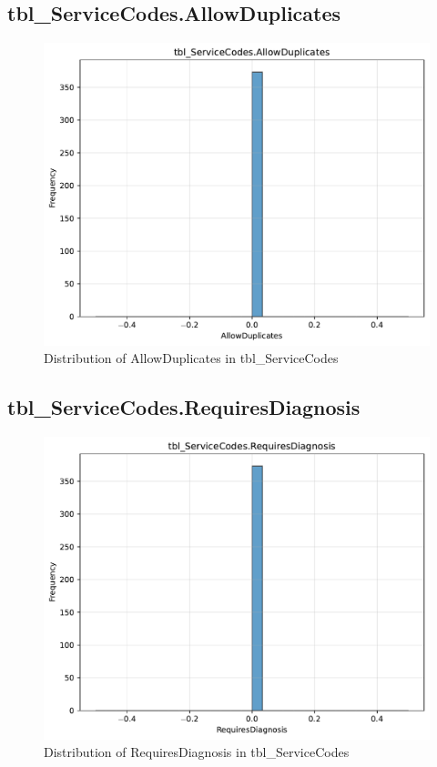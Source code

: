 \subsection{tbl\_ServiceCodes.AllowDuplicates}

\begin{figure}[htbp]
\centering
\includegraphics[width=\textwidth]{figures/dbo_tbl_ServiceCodes_AllowDuplicates.pdf}
\caption{Distribution of AllowDuplicates in tbl\_ServiceCodes}
\end{figure}\newpage

\subsection{tbl\_ServiceCodes.RequiresDiagnosis}

\begin{figure}[htbp]
\centering
\includegraphics[width=\textwidth]{figures/dbo_tbl_ServiceCodes_RequiresDiagnosis.pdf}
\caption{Distribution of RequiresDiagnosis in tbl\_ServiceCodes}
\end{figure}\newpage

